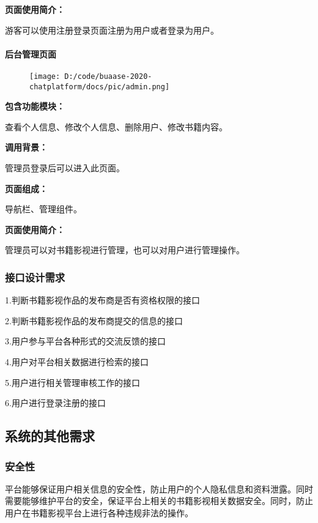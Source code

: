\documentclass[
]{article}
\begin{document}
\textbf{页面使用简介：}

游客可以使用注册登录页面注册为用户或者登录为用户。

\hypertarget{header-n1341}{%
\paragraph{后台管理页面}\label{header-n1341}}

\begin{figure}
\centering
\texttt{[image: D:/code/buaase-2020-chatplatform/docs/pic/admin.png]}
\caption{}
\end{figure}

\textbf{包含功能模块：}

查看个人信息、修改个人信息、删除用户、修改书籍内容。

\textbf{调用背景：}

管理员登录后可以进入此页面。

\textbf{页面组成：}

导航栏、管理组件。

\textbf{页面使用简介：}

管理员可以对书籍影视进行管理，也可以对用户进行管理操作。

\hypertarget{header-n1351}{%
\subsubsection{接口设计需求}\label{header-n1351}}

1.判断书籍影视作品的发布商是否有资格权限的接口

2.判断书籍影视作品的发布商提交的信息的接口

3.用户参与平台各种形式的交流反馈的接口

4.用户对平台相关数据进行检索的接口

5.用户进行相关管理审核工作的接口

6.用户进行登录注册的接口

\hypertarget{header-n1358}{%
\subsection{系统的其他需求}\label{header-n1358}}

\hypertarget{header-n1359}{%
\subsubsection{安全性}\label{header-n1359}}

平台能够保证用户相关信息的安全性，防止用户的个人隐私信息和资料泄露。同时需要能够维护平台的安全，保证平台上相关的书籍影视相关数据安全。同时，防止用户在书籍影视平台上进行各种违规非法的操作。
\end{document}
